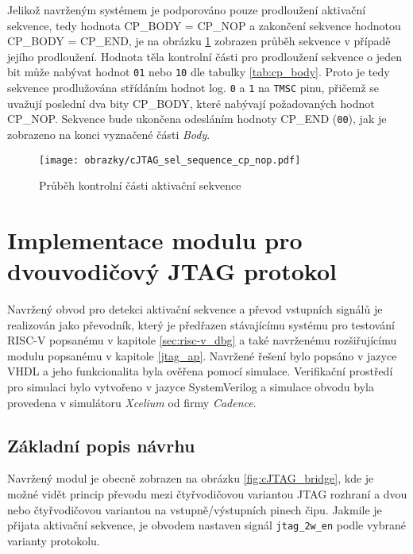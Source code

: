 Jelikož navrženým systémem je podporováno pouze prodloužení aktivační sekvence, tedy hodnota CP\_BODY = CP\_NOP a zakončení sekvence hodnotou \\CP\_BODY = CP\_END, je na obrázku \ref{fig:cJTAG_sel_cp_nop} zobrazen průběh sekvence v případě jejího prodloužení. Hodnota těla kontrolní části pro prodloužení sekvence o jeden bit může nabývat hodnot \texttt{01} nebo \texttt{10} dle tabulky \ref{tab:cp_body}. Proto je tedy sekvence prodlužována střídáním hodnot log. \texttt{0} a \texttt{1} na \texttt{\acs{TMSC}} pinu, přičemž se uvažují poslední dva bity CP\_BODY, které nabývají požadovaných hodnot CP\_NOP. Sekvence bude ukončena odesláním hodnoty CP\_END (\texttt{00}), jak je zobrazeno na konci vyznačené části \textit{Body}.

\begin{figure}[!h]
  \begin{center}
    \texttt{[image: obrazky/cJTAG\_sel\_sequence\_cp\_nop.pdf]}
  \end{center}
  \caption{Průběh kontrolní části aktivační sekvence}
	\label{fig:cJTAG_sel_cp_nop}
\end{figure}

\section{Implementace modulu pro dvouvodičový \acs{JTAG} protokol}
Navržený obvod pro detekci aktivační sekvence a převod vstupních signálů je realizován jako převodník, který je předřazen stávajícímu systému pro testování \acs{RISC-V} popsanému v kapitole \ref{sec:risc-v_dbg} a také navrženému rozšiřujícímu modulu popsanému v kapitole \ref{jtag_ap}. Navržené řešení bylo popsáno v jazyce \acs{VHDL} a jeho funkcionalita byla ověřena pomocí simulace. Verifikační prostředí pro simulaci bylo vytvořeno v jazyce SystemVerilog a simulace obvodu byla provedena v simulátoru \textit{Xcelium} od firmy \textit{Cadence}.

\subsection{Základní popis návrhu}	\label{subsec:cJTAG_adapter}
Navržený modul je obecně zobrazen na obrázku \ref{fig:cJTAG_bridge}, kde je možné vidět princip převodu mezi čtyřvodičovou variantou \acs{JTAG} rozhraní a dvou nebo čtyřvodičovou variantou na vstupně/výstupních pinech čipu. Jakmile je přijata aktivační sekvence, je obvodem nastaven signál \texttt{jtag\_2w\_en} podle vybrané varianty protokolu.

